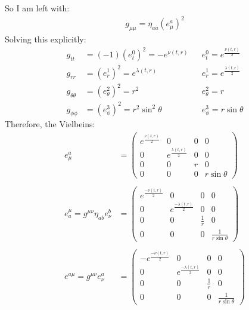 \documentclass[12pt]{article}
\begin{document}
So I am left with:
\begin{align}
  g_{\mu\mu} = \eta_{aa}(e^a_\mu)^2
\end{align}
Solving this explicitly:
\begin{align*}
  g_{tt} &= (-1)(e^0_t)^2 = -e^{\nu(t,r)} &&e^0_t = e^{\frac{\nu(t,r)}{2}} \\
  g_{rr} &= (e^1_r)^2 = e^{\lambda(t,r)} &&e^1_r = e^{\frac{\lambda(t,r)}{2}} \\
  g_{\theta\theta} &= (e^2_\theta)^2 = r^2 &&e^2_\theta = r \\
  g_{\phi\phi} &= (e^3_\phi)^2 = r^2\sin^2{\theta} &&e^3_\phi = r\sin{\theta}
\end{align*}
Therefore, the Vielbeins:
\begin{align*}
  e^a_\mu &= \begin{pmatrix}
    e^{\frac{\nu(t,r)}{2}} & 0 & 0 & 0 \\
    0 & e^{\frac{\lambda(t,r)}{2}} & 0 & 0 \\
    0 & 0 & r & 0 \\
    0 & 0 & 0 & r\sin{\theta}
  \end{pmatrix} \\ \\
  e^\mu_a = g^{\mu\nu}\eta_{ab}e^b_\nu &=
  \begin{pmatrix}
    e^{\frac{-\nu(t,r)}{2}} & 0 & 0 & 0 \\
    0 & e^{\frac{-\lambda(t,r)}{2}} & 0 & 0 \\
    0 & 0 & \frac{1}{r} & 0 \\
    0 & 0 & 0 & \frac{1}{r\sin{\theta}}
  \end{pmatrix} \\ \\
  e^{a\mu} = g^{\mu\nu}e^a_\nu &=
  \begin{pmatrix}
    -e^{\frac{-\nu(t,r)}{2}} & 0 & 0 & 0 \\
    0 & e^{\frac{-\lambda(t,r)}{2}} & 0 & 0 \\
    0 & 0 & \frac{1}{r} & 0 \\
    0 & 0 & 0 & \frac{1}{r\sin{\theta}}
  \end{pmatrix}
\end{align*}
\end{document}

